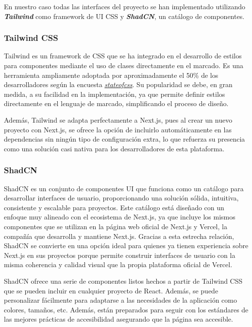 En nuestro caso todas las interfaces del proyecto se han implementado utilizando \textbf{\textit{Tailwind}} como framework de UI CSS y \textbf{\textit{ShadCN}}, un catálogo de componentes.

\subsubsection{Tailwind CSS}

Tailwind es un framework de CSS que se ha integrado en el desarrollo de estilos para componentes mediante el uso de clases directamente en el marcado. Es una herramienta ampliamente adoptada por aproximadamente el 50\% de los desarrolladores según la encuesta \href{https://2023.stateofcss.com/es-ES/css-frameworks/}{\textit{stateofcss}}. Su popularidad se debe, en gran medida, a su facilidad en la implementación, ya que permite definir estilos directamente en el lenguaje de marcado, simplificando el proceso de diseño. 

Además, Tailwind se adapta perfectamente a Next.js, pues al crear un nuevo proyecto con Next.js, se ofrece la opción de incluirlo automáticamente en las dependencias sin ningún tipo de configuración extra, lo que refuerza su presencia como una solución casi nativa para los desarrolladores de esta plataforma.

\subsubsection{ShadCN}

ShadCN es un conjunto de componentes UI que funciona como un catálogo para desarrollar interfaces de usuario, proporcionando una solución sólida, intuitiva, consistente y escalable para proyectos. Este catálogo está diseñado con un enfoque muy alineado con el ecosistema de Next.js, ya que incluye los mismos componentes que se utilizan en la página web oficial de Next.js y Vercel, la compañía que desarrolla y mantiene Next.js. Gracias a esta estrecha relación, ShadCN se convierte en una opción ideal para quienes ya tienen experiencia sobre Next.js en sus proyectos porque permite construir interfaces de usuario con la misma coherencia y calidad visual que la propia plataforma oficial de Vercel.

ShadCN ofrece una serie de componentes listos hechos a partir de Tailwind CSS que se pueden incluir en cualquier proyecto de React. Además, se puede personalizar fácilmente para adaptarse a las necesidades de la aplicación como colores, tamaños, etc. Además, están preparados para seguir con los estándares de las mejores prácticas de accesibilidad asegurando que la página sea accesible.

